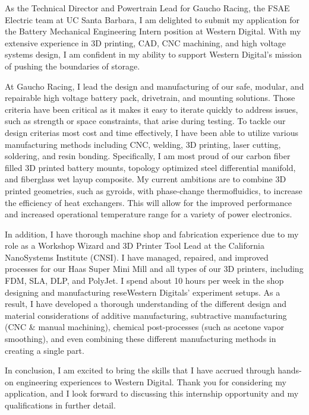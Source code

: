 \documentclass[11pt, letterpaper]{awesome-cv} %
\begin{document}
\makecvheader %

\makelettertitle %


\begin{cvletter}


As the Technical Director and Powertrain Lead for Gaucho Racing, the FSAE Electric team at UC Santa Barbara, I am delighted to submit my application for the Battery Mechanical Engineering Intern position at Western Digital. With my extensive experience in 3D printing, CAD, CNC machining, and high voltage systems design, I am confident in my ability to support Western Digital's mission of pushing the boundaries of storage.

At Gaucho Racing, I lead the design and manufacturing of our safe, modular, and repairable high voltage battery pack, drivetrain, and mounting solutions. Those criteria have been critical as it makes it easy to iterate quickly to address issues, such as strength or space constraints, that arise during testing. To tackle our design criterias most cost and time effectively, I have been able to utilize various manufacturing methods including CNC, welding, 3D printing, laser cutting, soldering, and resin bonding. Specifically, I am most proud of our carbon fiber filled 3D printed battery mounts, topology optimized steel differential manifold, and fiberglass wet layup composite. My current ambitions are to combine 3D printed geometries, such as gyroids, with phase-change thermofluidics, to increase the efficiency of heat exchangers. This will allow for the improved performance and increased operational temperature range for a variety of power electronics.

In addition, I have thorough machine shop and fabrication experience due to my role as a Workshop Wizard and 3D Printer Tool Lead at the California NanoSystems Institute (CNSI). I have managed, repaired, and improved processes for our Haas Super Mini Mill and all types of our 3D printers, including FDM, SLA, DLP, and PolyJet. I spend about 10 hours per week in the shop designing and manufacturing reseWestern Digitals' experiment setups. As a result, I have developed a thorough understanding of the different design and material considerations of additive manufacturing, subtractive manufacturing (CNC \& manual machining), chemical post-processes (such as acetone vapor smoothing), and even combining these different manufacturing methods in creating a single part.

In conclusion, I am excited to bring the skills that I have accrued through hands-on engineering experiences to Western Digital. Thank you for considering my application, and I look forward to discussing this internship opportunity and my qualifications in further detail.


\end{cvletter}


\makeletterclosing %
\end{document}
